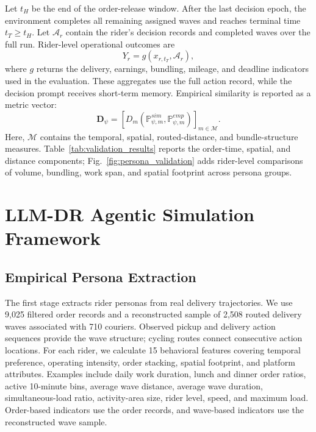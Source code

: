 \documentclass[letterpaper,journal]{IEEEtran}
\begin{document}
Let $t_H$ be the end of the order-release window. After the last decision epoch, the environment completes all remaining assigned waves and reaches terminal time $t_T\geq t_H$. Let $\mathcal{A}_r$ contain the rider's decision records and completed waves over the full run. Rider-level operational outcomes are
\begin{equation}
Y_r=g(x_{r,t_T},\mathcal{A}_r),
\end{equation}
where $g$ returns the delivery, earnings, bundling, mileage, and deadline indicators used in the evaluation. These aggregates use the full action record, while the decision prompt receives short-term memory. Empirical similarity is reported as a metric vector:
\begin{equation}
\mathbf D_{\psi}=\left[
D_m\!\left(\mathbb{P}^{sim}_{\psi,m},
\mathbb{P}^{emp}_{\psi,m}\right)
\right]_{m\in\mathcal{M}}.
\end{equation}
Here, $\mathcal{M}$ contains the temporal, spatial, routed-distance, and bundle-structure measures. Table~\ref{tab:validation_results} reports the order-time, spatial, and distance components; Fig.~\ref{fig:persona_validation} adds rider-level comparisons of volume, bundling, work span, and spatial footprint across persona groups.

\section{LLM-DR Agentic Simulation Framework}
\subsection{Empirical Persona Extraction}
The first stage extracts rider personas from real delivery trajectories. We use 9,025 filtered order records and a reconstructed sample of 2,508 routed delivery waves associated with 710 couriers. Observed pickup and delivery action sequences provide the wave structure; cycling routes connect consecutive action locations. For each rider, we calculate 15 behavioral features covering temporal preference, operating intensity, order stacking, spatial footprint, and platform attributes. Examples include daily work duration, lunch and dinner order ratios, active 10-minute bins, average wave distance, average wave duration, simultaneous-load ratio, activity-area size, rider level, speed, and maximum load. Order-based indicators use the order records, and wave-based indicators use the reconstructed wave sample.
\end{document}
